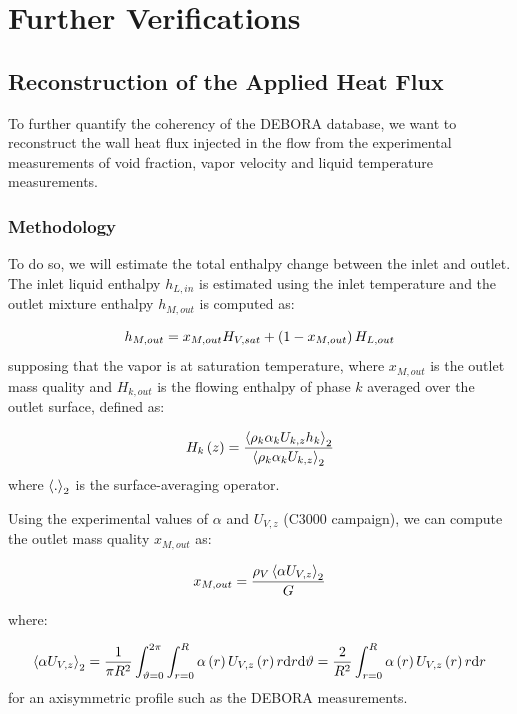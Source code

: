 \section{Further Verifications}


\subsection{Reconstruction of the Applied Heat Flux}
\label{subsec:deb_phi_corr}


To further quantify the coherency of the DEBORA database, we want to reconstruct the wall heat flux injected in the flow from the experimental measurements of void fraction, vapor velocity and liquid temperature measurements.

\subsubsection{Methodology}

To do so, we will estimate the total enthalpy change between the inlet and outlet. The inlet liquid enthalpy $h_{L,in}$ is estimated using the inlet temperature and the outlet mixture enthalpy $h_{M,out}$ is computed as:

\begin{equation}
h_{M,out}=x_{M,out}H_{V,sat}+\left( 1-x_{M,out} \right)H_{L,out}
\end{equation}
supposing that the vapor is at saturation temperature, where $x_{M,out}$ is the outlet mass quality and $H_{k,out}$ is the flowing enthalpy of phase $k$ averaged over the outlet surface, defined as:

\begin{equation}
H_{k}\left( z \right) = \frac{\left< \rho_{k}\alpha_{k}U_{k,z} h_{k} \right>_{2}}{\left<  \rho_{k}\alpha_{k}U_{k,z} \right>_{2}}
\end{equation}
where $\left< . \right>_{2}$ is the surface-averaging operator.


\npar
Using the experimental values of $\alpha$ and $U_{V,z}$ (C3000 campaign), we can compute the outlet mass quality $x_{M,out}$ as:

\begin{equation}
x_{M,out} = \frac{\rho_{V}\left< \alpha U_{V,z} \right>_{2}}{G}
\end{equation}

where:

\begin{equation}
\left< \alpha U_{V,z} \right>_{2} = \frac{1}{\pi R^{2}}\int_{\vartheta=0}^{2\pi} \int_{r=0}^{R} \alpha\left( r \right) U_{V,z}\left( r \right) r \mathrm{d}r \mathrm{d}\vartheta = \frac{2}{R^{2}}\int_{r=0}^{R}  \alpha\left( r \right) U_{V,z}\left( r \right) r \mathrm{d}r
\end{equation}
for an axisymmetric profile such as the DEBORA measurements.

